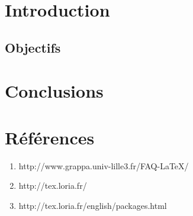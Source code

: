 \section{Introduction}

\subsection {Objectifs}

\section{Conclusions}
\section{Références}
\begin{enumerate}
\item http://www.grappa.univ-lille3.fr/FAQ-LaTeX/ 
\item http://tex.loria.fr/
\item http://tex.loria.fr/english/packages.html
\end{enumerate}
